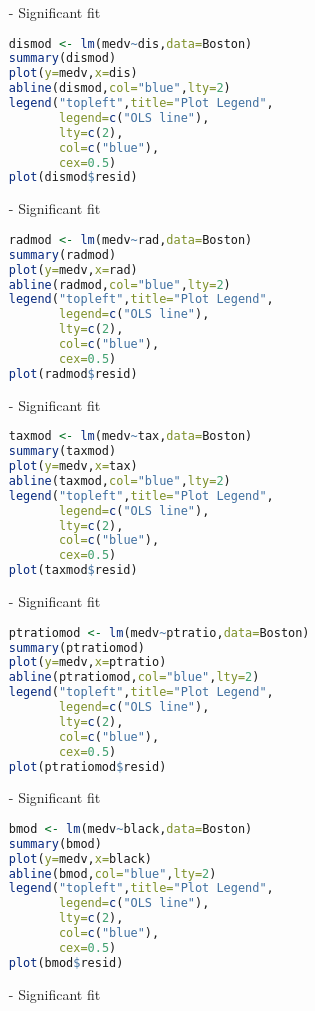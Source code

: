 \documentclass[11pt]{report}
\begin{document}
\begin{itemize}
\item[-] Significant fit

\begin{lstlisting}[language=R]
dismod <- lm(medv~dis,data=Boston)
summary(dismod)
plot(y=medv,x=dis) 
abline(dismod,col="blue",lty=2)
legend("topleft",title="Plot Legend",
       legend=c("OLS line"),
       lty=c(2),
       col=c("blue"),
       cex=0.5)
plot(dismod$resid)
\end{lstlisting}

\item[-] Significant fit

\begin{lstlisting}[language=R]
radmod <- lm(medv~rad,data=Boston)
summary(radmod) 
plot(y=medv,x=rad) 
abline(radmod,col="blue",lty=2)
legend("topleft",title="Plot Legend",
       legend=c("OLS line"),
       lty=c(2),
       col=c("blue"),
       cex=0.5)
plot(radmod$resid)
\end{lstlisting}

\item[-] Significant fit

\begin{lstlisting}[language=R]
taxmod <- lm(medv~tax,data=Boston)
summary(taxmod) 
plot(y=medv,x=tax) 
abline(taxmod,col="blue",lty=2)
legend("topleft",title="Plot Legend",
       legend=c("OLS line"),
       lty=c(2),
       col=c("blue"),
       cex=0.5)
plot(taxmod$resid)
\end{lstlisting}
\item[-] Significant fit

\begin{lstlisting}[language=R]
ptratiomod <- lm(medv~ptratio,data=Boston)
summary(ptratiomod) 
plot(y=medv,x=ptratio) 
abline(ptratiomod,col="blue",lty=2)
legend("topleft",title="Plot Legend",
       legend=c("OLS line"),
       lty=c(2),
       col=c("blue"),
       cex=0.5)
plot(ptratiomod$resid)
\end{lstlisting}
\item[-] Significant fit

\begin{lstlisting}[language=R]
bmod <- lm(medv~black,data=Boston)
summary(bmod) 
plot(y=medv,x=black) 
abline(bmod,col="blue",lty=2)
legend("topleft",title="Plot Legend",
       legend=c("OLS line"),
       lty=c(2),
       col=c("blue"),
       cex=0.5)
plot(bmod$resid)
\end{lstlisting}

\item[-] Significant fit


\end{itemize}
\end{document}

